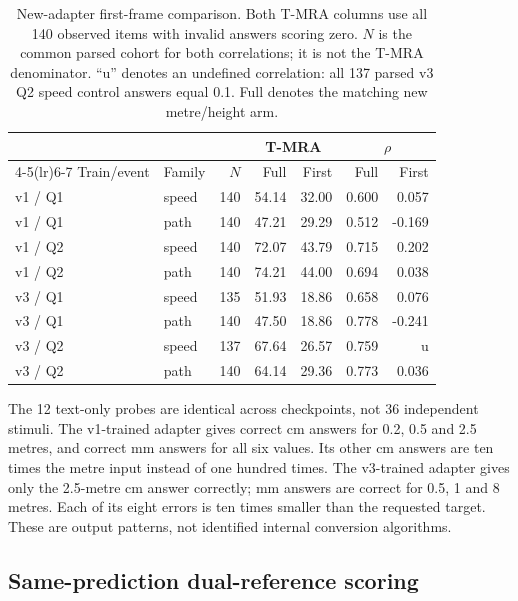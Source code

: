 \documentclass[11pt]{article}
\begin{document}
\begin{table}[t]
\centering\small
\setlength{\tabcolsep}{3pt}
\caption{New-adapter first-frame comparison. Both T-MRA columns use all
140 observed items with invalid answers scoring zero. $N$ is the common
parsed cohort for both correlations; it is not the T-MRA denominator.
``u'' denotes an undefined correlation: all 137 parsed v3 Q2 speed control
answers equal 0.1. Full denotes the matching new metre/height arm.}
\label{tab:matched_label_temporal}
\begin{tabular}{llrrrrr}
\toprule
 & & & \multicolumn{2}{c}{T-MRA} & \multicolumn{2}{c}{$\rho$} \\
\cmidrule(lr){4-5}\cmidrule(lr){6-7}
Train/event & Family & $N$ & Full & First & Full & First \\
\midrule
v1 / Q1 & speed & 140 & 54.14 & 32.00 & 0.600 & 0.057 \\
v1 / Q1 & path & 140 & 47.21 & 29.29 & 0.512 & -0.169 \\
v1 / Q2 & speed & 140 & 72.07 & 43.79 & 0.715 & 0.202 \\
v1 / Q2 & path & 140 & 74.21 & 44.00 & 0.694 & 0.038 \\
v3 / Q1 & speed & 135 & 51.93 & 18.86 & 0.658 & 0.076 \\
v3 / Q1 & path & 140 & 47.50 & 18.86 & 0.778 & -0.241 \\
v3 / Q2 & speed & 137 & 67.64 & 26.57 & 0.759 & u \\
v3 / Q2 & path & 140 & 64.14 & 29.36 & 0.773 & 0.036 \\
\bottomrule
\end{tabular}
\end{table}

The 12 text-only probes are identical across checkpoints, not 36 independent
stimuli. The v1-trained adapter gives correct cm answers for 0.2, 0.5 and
2.5 metres, and correct mm answers for all six values. Its other cm answers
are ten times the metre input instead of one hundred times. The v3-trained
adapter gives only the 2.5-metre cm answer correctly; mm answers are correct
for 0.5, 1 and 8 metres. Each of its eight errors is ten times smaller than
the requested target. These are output patterns, not identified internal
conversion algorithms.

\subsection{Same-prediction dual-reference scoring}
\label{app:paired_reference_scores}
\end{document}
